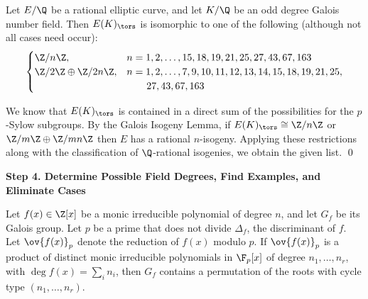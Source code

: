 \begin{frame}[plain]
\footnotesize
\begin{lem}
Let $E/\Q$ be a rational elliptic curve, and let $K/\Q$ be an odd degree Galois number field. Then $E(K)_\tors$ is isomorphic to one of the following (although not all cases need occur):
	\[
	\begin{cases}
	\Z/n\Z, & n= 1, 2, \ldots, 15, 18, 19, 21, 25, 27, 43, 67, 163 \\
	\Z/2\Z \oplus \Z/2n\Z, & n= 1, 2, \ldots, 7, 9, 10, 11, 12, 13, 14, 15, 18, 19, 21, 25, \\
	& \quad\quad 27, 43, 67, 163
	\end{cases}
	\]
\end{lem} \pspace

\pf We know that $E(K)_\tors$ is contained in a direct sum of the possibilities for the $p$-Sylow subgroups. By the Galois Isogeny Lemma, if $E(K)_\tors \cong \Z/n\Z$ or $\Z/m\Z \oplus \Z/mn\Z$ then $E$ has a rational $n$-isogeny. Applying these restrictions along with the classification of $\Q$-rational isogenies, we obtain the given list. \hfill\qed
\end{frame}





\begin{frame}[plain]
\vfill
\begin{center} {\bfseries \Large \textcolor{UniGray}{Step 4. Determine Possible Field Degrees, Find Examples, and Eliminate Cases}} \end{center}
\vfill 
\end{frame}





\begin{frame}[plain]
\begin{thm}[Dedekind]
Let $f(x) \in \Z[x]$ be a monic irreducible polynomial of degree $n$, and let $G_f$ be its Galois group. Let $p$ be a prime that does not divide $\Delta_f$, the discriminant of $f$. Let $\ov{f(x)}_p$ denote the reduction of $f(x)$ modulo $p$. If $\ov{f(x)}_p$ is a product of distinct monic irreducible polynomials in $\F_p[x]$ of degree $n_1, \ldots, n_r$, with $\deg f(x)= \sum_i n_i$, then $G_f$ contains a permutation of the roots with cycle type $(n_1, \ldots, n_r)$. 
\end{thm}
\end{frame}





